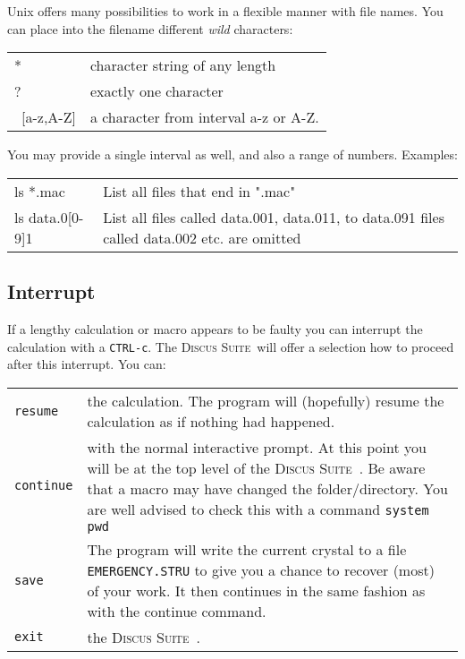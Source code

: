 \documentclass[11pt]{report}
\newcommand{\Suite}{\textsc{Discus Suite\ }}
\begin{document}
Unix offers many possibilities to work in a flexible manner with file 
names. You can place into the filename different {\it wild} characters:

\begin{tabularx}{\textwidth}{p{25mm}X}
* & character string of any length\\
? & exactly one character\\
\ [a-z,A-Z] & a character from interval a-z or A-Z.\\
\end{tabularx}

You may provide a single interval as well, and also a range of numbers.
Examples:

\begin{tabularx}{\textwidth}{p{25mm}X}
ls *.mac & List all files that end in ".mac"\\
ls data.0[0-9]1 & List all files called data.001, data.011, to data.091
files called data.002 etc. are omitted\\
\end{tabularx}


\subsection{Interrupt} \label{over-inter}
If a lengthy calculation or macro appears to be faulty you can interrupt
the calculation with a {\tt CTRL-c}. The \Suite will offer a selection
how to proceed after this interrupt. You can:


\begin{tabularx}{\textwidth}{p{25mm}X}
{\tt resume} & the calculation. The program will (hopefully) resume
   the calculation as if nothing had happened. \\
{\tt continue} & with the normal interactive prompt. At this point
   you will be at the top level of the \Suite. Be aware that a macro
   may have changed the folder/directory. You are well advised to 
   check this with a command {\tt system pwd} \\
{\tt save} & The program will write the current crystal 
   to a file {\tt EMERGENCY.STRU} to give you a chance to recover 
   (most) of your work. It then continues in the same fashion as with the
   continue command. \\
{\tt exit} & the \Suite. \\
\end{tabularx}





\end{document}
